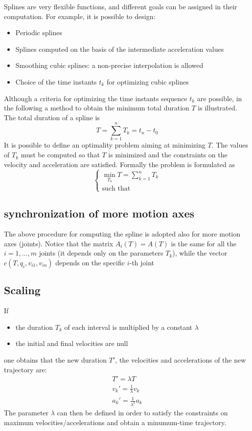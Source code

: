 \documentclass{book}
\begin{document}
Splines are very flexible functions, and different goals can be assigned in their computation. For example, it is possible to design: 
\begin{itemize}
  \item Periodic splines 
  \item Splines computed on the basis of the intermediate acceleration values 
  \item Smoothing cubic splines: a non-precise interpolation is allowed 
  \item Choice of the time instants $t_k$ for optimizing cubic splines 
\end{itemize}

Although a criteria for optimizing the time instants sequence $t_k$ are possible, in the following a method to obtain the minimum total duration $T$ is illustrated. The total duration of a spline is 
\[
  T=\displaystyle\sum_{k=1}^{n}T_k=t_n-t_0
\]
It is possible to define an optimality problem aiming at minimizing $T$. The values of $T_k$ must be computed so that $T$ is minimized and the constraints on the velocity and acceleration are satisfied. Formally the problem is formulated as 
\[
  \begin{cases}
    \min_{T_k}T=\displaystyle\sum_{k=1}^{n}T_k\\
    \text{such that} %
  \end{cases}
\]

\subsection{synchronization of more motion axes}
The above procedure for computing the spline is adopted also for more motion axes (joints). Notice that the matrix $A_i(T)=A(T)$ is the same for all the $i=1,\dots,m$ joints (it depends only on the parameters $T_k$), while the vector $c(T,q_i,v_{i1},v_{in})$ depends on the specific $i$-th joint

\subsection{Scaling}
If 
\begin{itemize}
  \item the duration $T_k$ of each interval is multiplied by a constant $\lambda$ 
    \item the initial and final velocities are null
\end{itemize}
one obtains that the new duration $T'$, the velocities and accelerations of the new trajectory are: 
\begin{gather*}
  T'= \lambda T \\
  v_k' = \displaystyle\frac{1}{\lambda} v_k\\
  a_k' = \displaystyle\frac{1}{\lambda^2} a_k
\end{gather*}
The parameter $\lambda$ can then be defined in order to satisfy the constraints on maximum velocities/accelerations and obtain a minumum-time trajectory.
\end{document}
